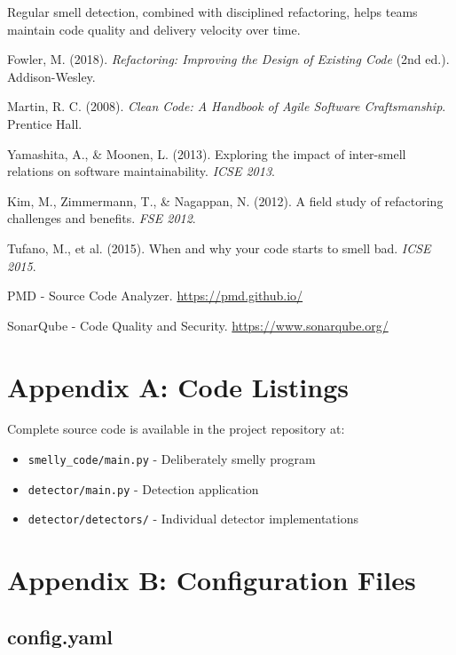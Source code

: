 \documentclass[11pt,a4paper]{article}
\begin{document}
Regular smell detection, combined with disciplined refactoring, helps teams maintain code quality and delivery velocity over time.

\begin{thebibliography}{9}

Fowler, M. (2018). \textit{Refactoring: Improving the Design of Existing Code} (2nd ed.). Addison-Wesley.

Martin, R. C. (2008). \textit{Clean Code: A Handbook of Agile Software Craftsmanship}. Prentice Hall.

Yamashita, A., \& Moonen, L. (2013). Exploring the impact of inter-smell relations on software maintainability. \textit{ICSE 2013}.

Kim, M., Zimmermann, T., \& Nagappan, N. (2012). A field study of refactoring challenges and benefits. \textit{FSE 2012}.

Tufano, M., et al. (2015). When and why your code starts to smell bad. \textit{ICSE 2015}.

PMD - Source Code Analyzer. \url{https://pmd.github.io/}

SonarQube - Code Quality and Security. \url{https://www.sonarqube.org/}

\end{thebibliography}

\appendix

\section{Appendix A: Code Listings}

Complete source code is available in the project repository at:
\begin{itemize}[noitemsep]
    \item \texttt{smelly\_code/main.py} - Deliberately smelly program
    \item \texttt{detector/main.py} - Detection application
    \item \texttt{detector/detectors/} - Individual detector implementations
\end{itemize}

\section{Appendix B: Configuration Files}

\subsection{config.yaml}
\end{document}
